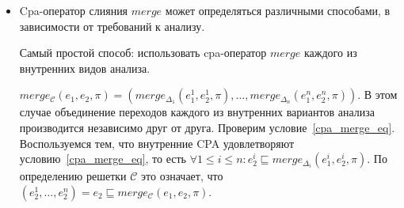 \begin{itemize}


\item 
Cpa-оператор слияния $merge$ может определяться различными способами, в зависимости от требований к анализу.

Самый простой способ: использовать cpa-оператор $merge$ каждого из внутренних видов анализа.

$merge_{\mathscr{C}}(e_1,e_2,\pi) = (merge_{\Delta_1}(e_1^1, e_2^1,\pi), \dots, merge_{\Delta_n}(e_1^n, e_2^n,\pi))$.
В этом случае объединение переходов каждого из внутренних вариантов анализа производится независимо друг от друга.
Проверим условие~\ref{cpa_merge_eq}.
Воспользуемся тем, что внутренние CPA удовлетворяют условию~\ref{cpa_merge_eq}, то есть $\forall 1 \le i \le n: e_2^i \sqsubseteq merge_{\Delta_i}(e_1^i, e_2^i,\pi)$.
По определению решетки $\mathscr{C}$ это означает, что $(e_2^1, \dots, e_2^n) = e_2 \sqsubseteq merge_{\mathscr{C}}(e_1,e_2,\pi)$.


\end{itemize}
